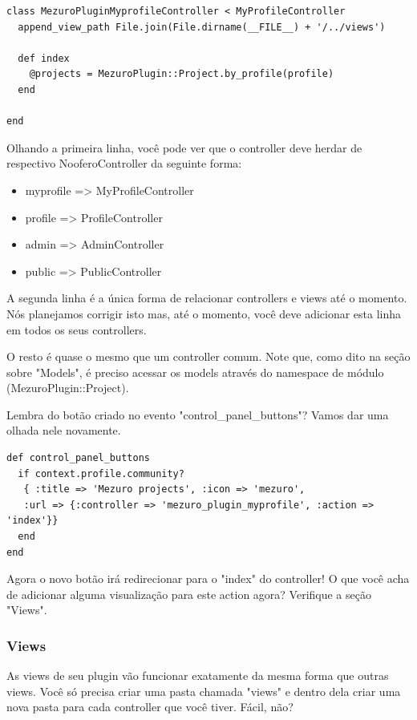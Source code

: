 \documentclass[11pt]{article}
\begin{document}
\begin{Verbatim}[frame=single,fontfamily=courier]
class MezuroPluginMyprofileController < MyProfileController
  append_view_path File.join(File.dirname(__FILE__) + '/../views')
 
  def index
    @projects = MezuroPlugin::Project.by_profile(profile)
  end
 
end
\end{Verbatim}

Olhando a primeira linha, você pode ver que o controller deve herdar de
respectivo NooferoController da seguinte forma:

\begin{itemize}
  \item myprofile => MyProfileController 
  \item profile => ProfileController 
  \item admin => AdminController 
  \item public => PublicController 
\end{itemize}

A segunda linha é a única forma de relacionar controllers e views até o
momento. Nós planejamos corrigir isto mas, até o momento, você deve adicionar
esta linha em todos os seus controllers.

O resto é quase o mesmo que um controller comum. Note que, como dito na seção
sobre "Models", é preciso acessar os models através do namespace de módulo
(MezuroPlugin::Project).

Lembra do botão criado no evento "control\_panel\_buttons"? Vamos dar uma
olhada nele novamente.

\begin{Verbatim}[frame=single,fontfamily=courier]
def control_panel_buttons
  if context.profile.community?
   { :title => 'Mezuro projects', :icon => 'mezuro',
   :url => {:controller => 'mezuro_plugin_myprofile', :action => 'index'}}
  end
end
\end{Verbatim}

Agora o novo botão irá redirecionar para o "index" do controller! O que você
acha de adicionar alguma visualização para este action agora? Verifique a
seção "Views".

\subsubsection{Views}

As views de seu plugin vão funcionar exatamente da mesma forma que outras
views. Você só precisa criar uma pasta chamada "views" e dentro dela criar uma
nova pasta para cada controller que você tiver. Fácil, não?
\end{document}
